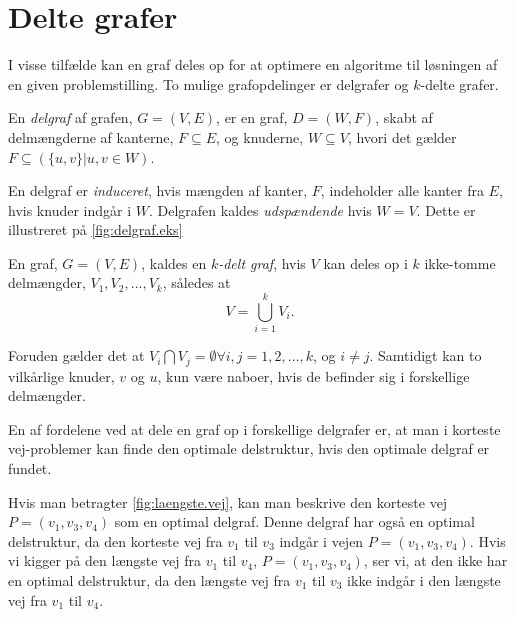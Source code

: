 \section{Delte grafer}
I visse tilfælde kan en graf deles op for at optimere en algoritme til løsningen af en given problemstilling.
To mulige grafopdelinger er delgrafer og $k$-delte grafer.

\begin{defn}[Delgraf] \label{defn:delgraf} %
En \emph{delgraf} af grafen, $G= (V,E)$, er en graf, $D = (W,F)$, skabt af delmængderne af kanterne, $F \subseteq E$, og knuderne, $W \subseteq V$, hvori det gælder $F \subseteq (\{u,v\} | u,v \in W)$.
\end{defn}

En delgraf er \emph{induceret}, hvis mængden af kanter, $F$, indeholder alle kanter fra $E$, hvis knuder indgår i $W$.
Delgrafen kaldes \emph{udspændende} hvis $W=V$. Dette er illustreret på \autoref{fig:delgraf.eks}



\begin{defn} \label{defn:k-delt} %
En graf, $G = (V, E)$, kaldes en \emph{$k$-delt graf}, hvis $V$ kan deles op i $k$ ikke-tomme delmængder, $V_1, V_2,\dotsc, V_k$, således at 
\begin{equation}
V = \bigcup_{i=1}^{k} V_i. 
\end{equation}

Foruden gælder det at $V_i \bigcap V_j  = \emptyset \forall i,j=1, 2, \dotsc, k$, og $i\neq j$. Samtidigt kan to vilkårlige knuder, $v$ og $u$, kun være naboer, hvis de befinder sig i forskellige delmængder. 
\end{defn}


En af fordelene ved at dele en graf op i forskellige delgrafer er, at man i korteste vej-problemer kan finde den optimale delstruktur, hvis den optimale delgraf er fundet. 

Hvis man betragter \autoref{fig:laengste.vej}, kan man beskrive den korteste vej $P=(v_1,v_3,v_4)$ som en optimal delgraf. Denne delgraf har også en optimal delstruktur, da den korteste vej fra $v_1$ til $v_3$ indgår i vejen $P=(v_1,v_3,v_4)$.
Hvis vi kigger på den længste vej fra $v_1$ til $v_4$, $P=(v_1,v_3,v_4)$, ser vi, at den ikke har en optimal delstruktur, da den længste vej fra $v_1$ til $v_3$ ikke indgår i den længste vej fra $v_1$ til $v_4$.








